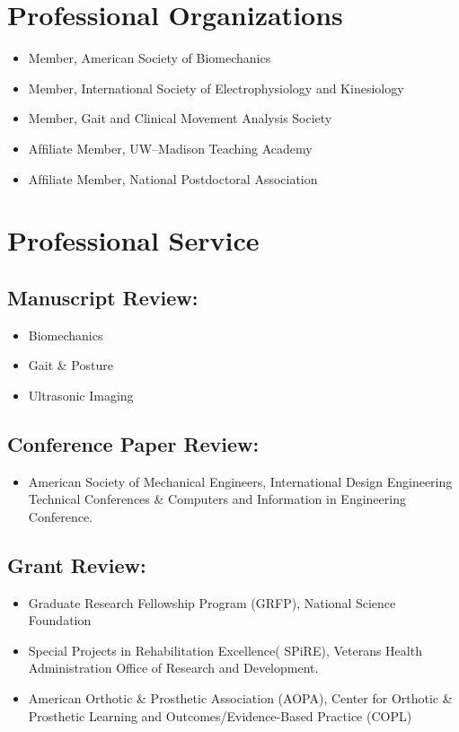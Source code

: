 \documentclass[letterpaper, 10pt]{article}
\begin{document}
\section{Professional Organizations}
\begin{itemize}
     \item Member, American Society of Biomechanics
     \item Member, International Society of Electrophysiology and Kinesiology
     \item Member, Gait and Clinical Movement Analysis Society
     \item Afﬁliate Member, UW--Madison Teaching Academy 
     \item Afﬁliate Member, National Postdoctoral Association
\end{itemize}

\section{Professional Service}
\subsection{Manuscript Review:}
\begin{itemize}
    \item Biomechanics
    \item Gait \& Posture
    \item Ultrasonic Imaging
\end{itemize}

\subsection{Conference Paper Review:}
\begin{itemize}
    \item American Society of Mechanical Engineers, International Design Engineering Technical Conferences \& Computers and Information in Engineering Conference.
\end{itemize}

\subsection{Grant Review:}
\begin{itemize}
    \item Graduate Research Fellowship Program (GRFP), National Science Foundation
    \item Special Projects in Rehabilitation Excellence( SPiRE), Veterans Health Administration Office of Research and Development.
    \item American Orthotic \& Prosthetic Association (AOPA), Center for Orthotic \& Prosthetic Learning and Outcomes/Evidence-Based Practice (COPL)
\end{itemize}
\end{document}
